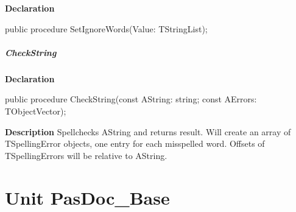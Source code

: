 \documentclass{report}
\newif\ifpdf
\begin{document}
\label{PasDoc_Aspell.TAspellProcess-SetIgnoreWords}
\begin{list}{}{
\setlength{\itemindent}{0cm}
\setlength{\listparindent}{0cm}
\setlength{\leftmargin}{\evensidemargin}
\addtolength{\leftmargin}{\tmplength}
\settowidth{\labelsep}{X}
\addtolength{\leftmargin}{\labelsep}
\setlength{\labelwidth}{\tmplength}
}
\item[\textbf{Declaration}\hfill]
\ifpdf
\begin{flushleft}
\fi
\begin{ttfamily}
public procedure SetIgnoreWords(Value: TStringList);\end{ttfamily}

\ifpdf
\end{flushleft}
\fi

\end{list}
\paragraph*{CheckString}\hspace*{\fill}

\label{PasDoc_Aspell.TAspellProcess-CheckString}
\begin{list}{}{
\setlength{\itemindent}{0cm}
\setlength{\listparindent}{0cm}
\setlength{\leftmargin}{\evensidemargin}
\addtolength{\leftmargin}{\tmplength}
\settowidth{\labelsep}{X}
\addtolength{\leftmargin}{\labelsep}
\setlength{\labelwidth}{\tmplength}
}
\item[\textbf{Declaration}\hfill]
\ifpdf
\begin{flushleft}
\fi
\begin{ttfamily}
public procedure CheckString(const AString: string; const AErrors: TObjectVector);\end{ttfamily}

\ifpdf
\end{flushleft}
\fi

\par
\item[\textbf{Description}]
Spellchecks AString and returns result. Will create an array of TSpellingError objects, one entry for each misspelled word. Offsets of TSpellingErrors will be relative to AString.

\end{list}
\chapter{Unit PasDoc{\_}Base}
\label{PasDoc_Base}
\end{document}
